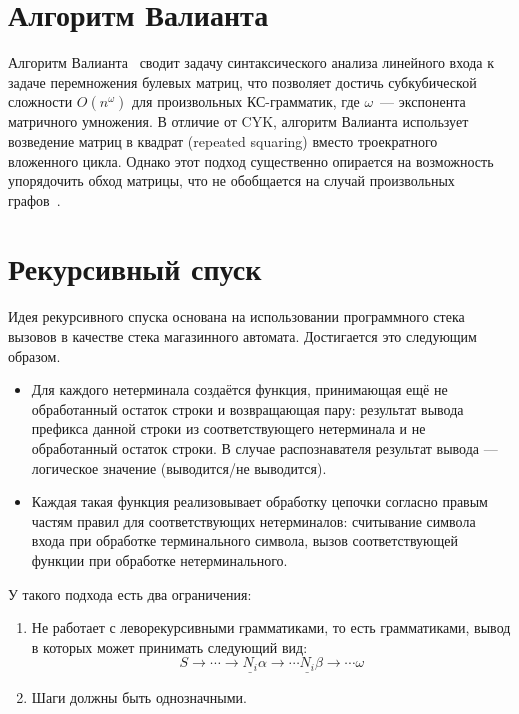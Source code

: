 \section{Алгоритм Валианта}

Алгоритм Валианта~ сводит задачу синтаксического анализа линейного входа к задаче перемножения булевых матриц, что позволяет достичь субкубической сложности $O(n^\omega)$ для произвольных КС-грамматик, где $\omega$~--- экспонента матричного умножения.
В отличие от CYK, алгоритм Валианта использует возведение матриц в квадрат (repeated squaring) вместо троекратного вложенного цикла.
Однако этот подход существенно опирается на возможность упорядочить обход матрицы, что не обобщается на случай произвольных графов~.

\section{Рекурсивный спуск}

Идея рекурсивного спуска основана на использовании программного стека вызовов в качестве стека магазинного автомата. Достигается это следующим образом.
\begin{itemize}
  \item Для каждого нетерминала создаётся функция, принимающая ещё не обработанный остаток строки и возвращающая пару: результат вывода префикса данной строки из соответствующего нетерминала и не обработанный остаток строки. В случае распознавателя результат вывода --- логическое значение (выводится/не выводится).
  \item Каждая такая функция реализовывает обработку цепочки согласно правым частям правил для соответствующих нетерминалов: считывание символа входа при обработке терминального символа, вызов соответствующей функции при обработке нетерминального.
\end{itemize}

У такого подхода есть два ограничения:
\begin{enumerate}
  \item Не работает с леворекурсивными грамматиками, то есть грамматиками, вывод в которых может принимать следующий вид:
  $$
  S \to \cdots \to \underline{N_i} \alpha \to \cdots \underline{N_i} \beta \to \cdots \omega
  $$
  \item Шаги должны быть однозначными.
\end{enumerate}

